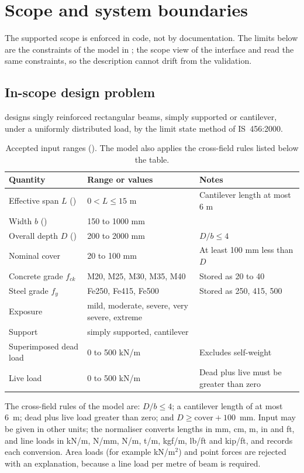 \chapter{Scope and system boundaries}\label{ch:scope}

The supported scope is enforced in code, not by documentation. The limits below are the constraints of the  model in ; the scope view of the interface and  read the same constraints, so the description cannot drift from the validation.

\section{In-scope design problem}
\sdcv{} designs singly reinforced rectangular beams, simply supported or cantilever, under a uniformly distributed load, by the limit state method of IS~456:2000.

\begin{table}[H]
\centering
\caption{Accepted input ranges (). The model also applies the cross-field rules listed below the table.}
\label{tab:ranges}
\begin{tabular}{@{}L{4.9cm}L{4.4cm}L{5.4cm}@{}}
\toprule
Quantity & Range or values & Notes \\
\midrule
Effective span $L$ () & $0 < L \le 15$ m & Cantilever length at most 6 m \\
Width $b$ () & 150 to 1000 mm & \\
Overall depth $D$ () & 200 to 2000 mm & $D/b \le 4$ \\
Nominal cover & 20 to 100 mm & At least 100 mm less than $D$ \\
Concrete grade $f_{ck}$ & M20, M25, M30, M35, M40 & Stored as 20 to 40 \\
Steel grade $f_y$ & Fe250, Fe415, Fe500 & Stored as 250, 415, 500 \\
Exposure & mild, moderate, severe, very severe, extreme & \\
Support & simply supported, cantilever & \\
Superimposed dead load & 0 to 500 kN/m & Excludes self-weight \\
Live load & 0 to 500 kN/m & Dead plus live must be greater than zero \\
\bottomrule
\end{tabular}
\end{table}

The cross-field rules of the model are: $D/b \le 4$; a cantilever length of at most 6~m; dead plus live load greater than zero; and $D \ge \text{cover} + 100$~mm. Input may be given in other units; the normaliser converts lengths in mm, cm, m, in and ft, and line loads in kN/m, N/mm, N/m, t/m, kgf/m, lb/ft and kip/ft, and records each conversion. Area loads (for example kN/m$^2$) and point forces are rejected with an explanation, because a line load per metre of beam is required.

